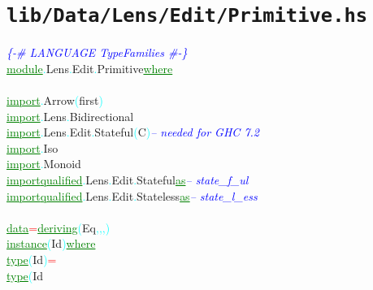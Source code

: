 \section{\texttt{lib/Data/Lens/Edit/Primitive.hs}}
\label{mod:Data.Lens.Edit.Primitive}
\textcolor{blue}{{\it{}\{-\# LANGUAGE TypeFamilies \#-\}}}\\\textcolor{green}{\underline{module}}\textcolor{cyan}{.}{\rm{}Lens}\textcolor{cyan}{.}{\rm{}Edit}\textcolor{cyan}{.}{\rm{}Primitive}\hsspace \textcolor{green}{\underline{where}}\\\\\textcolor{green}{\underline{import}}\textcolor{cyan}{.}{\rm{}Arrow}\hsspace \textcolor{cyan}{(}{\rm{}first}\textcolor{cyan}{)}\\\textcolor{green}{\underline{import}}\textcolor{cyan}{.}{\rm{}Lens}\textcolor{cyan}{.}{\rm{}Bidirectional}\\\textcolor{green}{\underline{import}}\textcolor{cyan}{.}{\rm{}Lens}\textcolor{cyan}{.}{\rm{}Edit}\textcolor{cyan}{.}{\rm{}Stateful}\hsspace \textcolor{cyan}{(}{\rm{}C}\textcolor{cyan}{)}\hsspace \textcolor{blue}{{\it{}-- needed for GHC 7.2}}\\\textcolor{green}{\underline{import}}\textcolor{cyan}{.}{\rm{}Iso}\\\textcolor{green}{\underline{import}}\textcolor{cyan}{.}{\rm{}Monoid}\\\textcolor{green}{\underline{import}}\hsspace \textcolor{green}{\underline{qualified}}\textcolor{cyan}{.}{\rm{}Lens}\textcolor{cyan}{.}{\rm{}Edit}\textcolor{cyan}{.}{\rm{}Stateful}\hsspace \hsspace \textcolor{green}{\underline{as}}\hsspace \textcolor{blue}{{\it{}-- state\_f\_ul}}\\\textcolor{green}{\underline{import}}\hsspace \textcolor{green}{\underline{qualified}}\textcolor{cyan}{.}{\rm{}Lens}\textcolor{cyan}{.}{\rm{}Edit}\textcolor{cyan}{.}{\rm{}Stateless}\hsspace \textcolor{green}{\underline{as}}\hsspace \textcolor{blue}{{\it{}-- state\_l\_ess}}\\\\\textcolor{green}{\underline{data}}\hsspace \textcolor{red}{=}\hsspace \textcolor{green}{\underline{deriving}}\hsspace \textcolor{cyan}{(}{\rm{}Eq}\textcolor{cyan}{,}\textcolor{cyan}{,}\textcolor{cyan}{,}\textcolor{cyan}{)}\\\textcolor{green}{\underline{instance}}\hsspace \textcolor{cyan}{(}{\rm{}Id}\textcolor{cyan}{)}\hsspace \textcolor{green}{\underline{where}}\\\hstab \textcolor{green}{\underline{type}}\hsspace \textcolor{cyan}{(}{\rm{}Id}\textcolor{cyan}{)}\hsspace \textcolor{red}{=}\\\hstab \textcolor{green}{\underline{type}}\hsspace \textcolor{cyan}{(}{\rm{}Id}\hsspace 